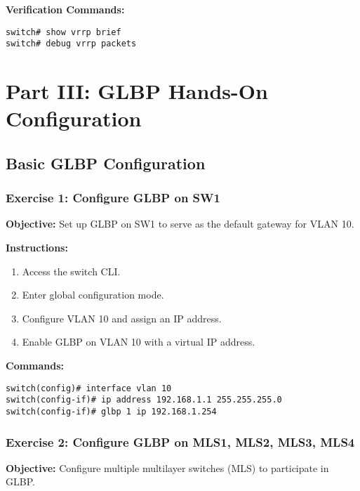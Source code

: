 \documentclass[12pt]{article}
\begin{document}
\textbf{Verification Commands:}
\begin{lstlisting}[style=CiscoCLI]
switch# show vrrp brief
switch# debug vrrp packets
\end{lstlisting}

\newpage


\section{Part III: GLBP Hands-On Configuration}

\subsection{Basic GLBP Configuration}

\subsubsection*{Exercise 1: Configure GLBP on SW1}
\textbf{Objective:} Set up GLBP on SW1 to serve as the default gateway for VLAN 10.

\textbf{Instructions:}
\begin{enumerate}
\item Access the switch CLI.
\item Enter global configuration mode.
\item Configure VLAN 10 and assign an IP address.
\item Enable GLBP on VLAN 10 with a virtual IP address.
\end{enumerate}

\textbf{Commands:}
\begin{lstlisting}[style=CiscoCLI]
switch(config)# interface vlan 10
switch(config-if)# ip address 192.168.1.1 255.255.255.0
switch(config-if)# glbp 1 ip 192.168.1.254
\end{lstlisting}

\bigskip

\subsubsection*{Exercise 2: Configure GLBP on MLS1, MLS2, MLS3, MLS4}
\textbf{Objective:} Configure multiple multilayer switches (MLS) to participate in GLBP.
\end{document}
